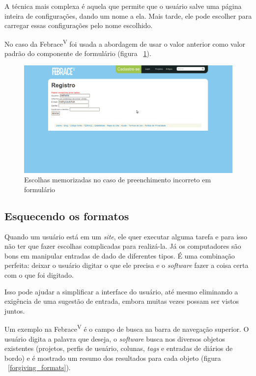 A técnica mais complexa é aquela que permite que o usuário salve uma página inteira de configurações, dando um nome a ela. Mais tarde, ele pode escolher para carregar essas configurações pelo nome escolhido.

No caso da Febrace\textsuperscript{V} foi usada a abordagem de usar o valor anterior como valor padrão do componente de formulário (figura ~\ref{remembered_choices}).

    \begin{figure}[h]
        \begin{center}
    \includegraphics[width=0.7\linewidth]{arquivos/remembered_choices.png}
        \end{center}
        \caption{Escolhas memorizadas no caso de preenchimento incorreto em formulário}
        \label{remembered_choices}
    \end{figure}

\subsection{Esquecendo os formatos}

Quando um usuário está em um \textit{site}, ele quer executar alguma tarefa e para isso não ter que fazer escolhas complicadas para realizá-la. Já os computadores são bons em manipular entradas de dado de diferentes tipos. É uma combinação perfeita: deixar o usuário digitar o que ele precisa e o \textit{software} fazer a coisa certa com o que foi digitado.

Isso pode ajudar a simplificar a interface do usuário, até mesmo eliminando a exigência de uma sugestão de entrada, embora muitas vezes possam ser vistos juntos.

Um exemplo na Febrace\textsuperscript{V} é o campo de busca na barra de navegação superior. O usuário digita a palavra que deseja, o \textit{software} busca nos diversos objetos existentes (projetos, perfis de usuário, colunas, \textit{tags} e entradas de diários de bordo) e é mostrado um resumo dos resultados para cada objeto (figura ~\ref{forgiving_formats}).

